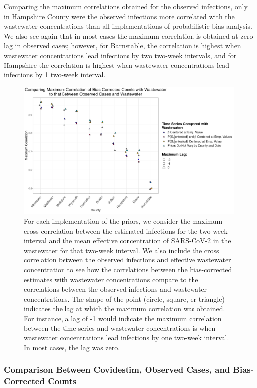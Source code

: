 \documentclass[12pt,twoside]{smiththesis}
\begin{document}
Comparing the maximum correlations obtained for the observed infections, only in Hampshire County were the observed infections more correlated with the wastewater concentrations than all implementations of probabilistic bias analysis. We also see again that in most cases the maximum correlation is obtained at zero lag in observed cases; however, for Barnstable, the correlation is highest when wastewater concentrations lead infections by two two-week intervals, and for Hampshire the correlation is highest when wastewater concentrations lead infections by 1 two-week interval.
\begin{figure}
\includegraphics[width=1\linewidth]{figure/correlation_observed_pb} \caption{\label{fig:correlation_observed_pb}For each implementation of the priors, we consider the maximum cross correlation between the estimated infections for the two week interval and the mean effective concentration of SARS-CoV-2 in the wastewater for that two-week interval. We also include the cross correlation between the observed infections and effective wastewater concentration to see how the correlations between the bias-corrected estimates with wastewater concentrations compare to the correlations between the observed infections and wastewater concentrations. The shape of the point (circle, square, or triangle) indicates the lag at which the maximum correlation was obtained. For instance, a lag of -1 would indicate the maximum correlation between the time series and wastewater concentrations is when wastewater concentrations lead infections by one two-week interval. In most cases, the lag was zero.}\label{fig:unnamed-chunk-89}
\end{figure}
\vspace{8 cm}

\hypertarget{comparison-between-covidestim-observed-cases-and-bias-corrected-counts}{%
\subsubsection{Comparison Between Covidestim, Observed Cases, and Bias-Corrected Counts}\label{comparison-between-covidestim-observed-cases-and-bias-corrected-counts}}
\end{document}
